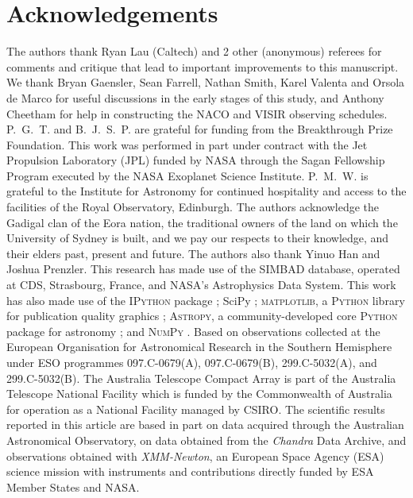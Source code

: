 \documentclass[preprint,times]{aastex61}
\begin{document}
\section*{Acknowledgements}
The authors thank Ryan Lau (Caltech) and 2 other (anonymous) referees for comments and critique that lead to important improvements to this manuscript.
We thank Bryan Gaensler, Sean Farrell, Nathan Smith, Karel Valenta and Orsola de Marco for useful discussions in the early stages of this study, and Anthony Cheetham for help in constructing the NACO and VISIR observing schedules. P.~G.~T. and B.~J.~S.~P. are grateful for funding from the Breakthrough Prize Foundation. This work was performed in part under contract with the Jet Propulsion Laboratory (JPL) funded by NASA through the Sagan Fellowship Program executed by the NASA Exoplanet Science Institute. P.~M.~W. is grateful to the Institute for Astronomy for continued hospitality and access to the facilities of the Royal Observatory, Edinburgh. The authors acknowledge the Gadigal clan of the Eora nation, the traditional owners of the land on which the University of Sydney is built, and we pay our respects to their knowledge, and their elders past, present and future. The authors also thank Yinuo Han and Joshua Prenzler. This research has made use of the SIMBAD database, operated at CDS, Strasbourg, France, and NASA's Astrophysics Data System. This work has also made use of the \textsc{IPython} package \citep{PER-GRA:2007}; SciPy \citep{scipy};  \textsc{matplotlib}, a \textsc{Python} library for publication quality graphics \citep{Hunter:2007}; \textsc{Astropy}, a community-developed core \textsc{Python} package for astronomy \citep{2013A&A...558A..33A}; and \textsc{NumPy} \citep{van2011numpy}. Based on observations collected at the European Organisation for Astronomical Research in the Southern Hemisphere under ESO programmes 097.C-0679(A), 097.C-0679(B), 299.C-5032(A), and 299.C-5032(B). The Australia Telescope Compact Array is part of the Australia Telescope National Facility which is funded by the Commonwealth of Australia for operation as a National Facility managed by CSIRO. The scientific results reported in this article are based in part on data acquired through the Australian Astronomical Observatory, on data obtained from the \emph{Chandra} Data Archive, and observations obtained with \emph{XMM-Newton}, an European Space Agency (ESA) science mission with instruments and contributions directly funded by ESA Member States and NASA.
\end{document}
